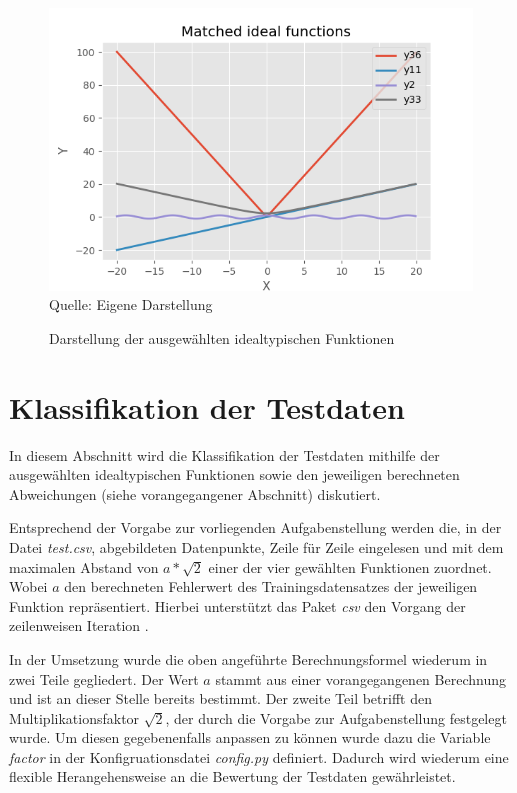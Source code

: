 \begin{figure}[h]
\centering
\caption{Darstellung der ausgewählten idealtypischen Funktionen}
\includegraphics[width=13cm]{../output/figures/ideal.png}\\
Quelle: Eigene Darstellung
\label{fig:ideal}
\end{figure}

\section{Klassifikation der Testdaten}
\label{sec:class}

In diesem Abschnitt wird die Klassifikation der Testdaten mithilfe der ausgewählten idealtypischen Funktionen sowie den jeweiligen berechneten Abweichungen (siehe vorangegangener Abschnitt) diskutiert.

Entsprechend der Vorgabe zur vorliegenden Aufgabenstellung werden die, in der Datei \emph{test.csv}, abgebildeten Datenpunkte, Zeile für Zeile eingelesen und mit dem maximalen Abstand von $ a*\sqrt{2}$ einer der vier gewählten Funktionen zuordnet. Wobei $a$ den berechneten Fehlerwert des Trainingsdatensatzes der jeweiligen Funktion repräsentiert. Hierbei unterstützt das Paket \emph{csv} den Vorgang der zeilenweisen Iteration \citep{python_software_foundation_csv_nodate-1}.

In der Umsetzung wurde die oben angeführte Berechnungsformel wiederum in zwei Teile gegliedert. Der Wert $a$ stammt aus einer vorangegangenen Berechnung und ist an dieser Stelle bereits bestimmt. Der zweite Teil betrifft den Multiplikationsfaktor $\sqrt{2}$, der durch die Vorgabe zur Aufgabenstellung festgelegt wurde. Um diesen gegebenenfalls anpassen zu können wurde dazu die Variable \emph{factor} in der Konfigruationsdatei \emph{config.py} definiert. Dadurch wird wiederum eine flexible Herangehensweise an die Bewertung der Testdaten gewährleistet.

